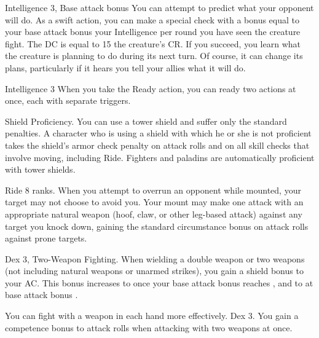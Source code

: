  Intelligence 3, Base attack bonus 
 You can attempt to predict what your opponent will do. As a swift action, you can make a special check with a bonus equal to your base attack bonus \add your Intelligence  per round you have seen the creature fight. The DC is equal to 15 \add the creature's CR. If you succeed, you learn what the creature is planning to do during its next turn. Of course, it can change its plans, particularly if it hears you tell your allies what it will do.

 Intelligence 3
 When you take the Ready action, you can ready two actions at once, each with separate triggers.

 Shield Proficiency.
 You can use a tower shield and suffer only the standard penalties.
 A character who is using a shield with which he or she is not proficient takes the shield's armor check penalty on attack rolls and on all skill checks that involve moving, including Ride.
 Fighters and paladins are automatically proficient with tower shields.

 Ride 8 ranks.
 When you attempt to overrun an opponent while mounted, your target may not choose to avoid you. Your mount may make one attack with an appropriate natural weapon (hoof, claw, or other leg-based attack) against any target you knock down, gaining the standard  circumstance bonus on attack rolls against prone targets.

 Dex 3, Two-Weapon Fighting.
 When wielding a double weapon or two weapons (not including natural weapons or unarmed strikes), you gain a  shield bonus to your AC. This bonus increases to  once your base attack bonus reaches , and to  at base attack bonus .

You can fight with a weapon in each hand more effectively.
 Dex 3.
 You gain a  competence bonus to attack rolls when attacking with two weapons at once.

